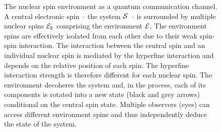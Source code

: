 \documentclass[aps,prl,floatfix,twocolumn,footinbib,superscriptaddress]{revtex4-1}
\begin{document}
\begin{figure}
\centerline{}
\caption{The nuclear spin environment as a quantum communication channel. A central electronic spin -- the system $\S$ -- is surrounded by multiple nuclear spins $\E_k$ comprising the environment $\E$. The environment spins are effectively isolated from each other due to their weak spin-spin interaction. The interaction between the central spin and an individual nuclear spin is mediated by the hyperfine interaction and depends on the relative position of each spin. The hyperfine interaction strength is therefore different for each nuclear spin. The environment decoheres the system and, in the process, each of its components is rotated into a new state (black and grey arrows) conditional on the central spin state. Multiple observers (eyes) can access different environment spins and thus independently deduce the state of the system.}
\label{fig:1}
\end{figure}
\end{document}
